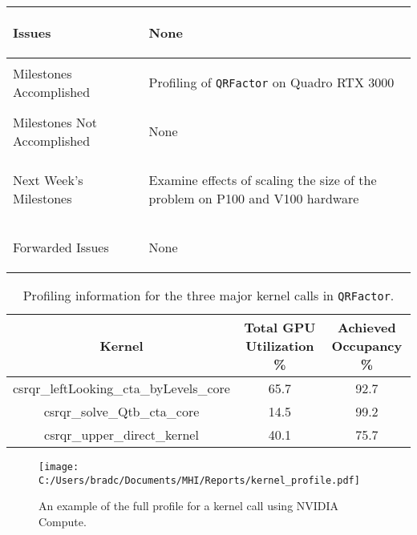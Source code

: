 \documentclass[11pt,letterpaper]{article}
\begin{document}
\begin{tabular}{| p{} | p{} |}
	Issues & \begin{enumerate*}
	\item[\tiny\textbullet] None
	\end{enumerate*} \\ \hline

	Milestones \newline Accomplished & \begin{enumerate*}
	\item[\tiny\textbullet] Profiling of \texttt{QRFactor} on Quadro RTX 3000 \newline
    \end{enumerate*} \\ \hline

	Milestones Not \newline Accomplished & \begin{enumerate*}
	\item[\tiny\textbullet] None
	\end{enumerate*} \\ \hline

	Next Week's \newline Milestones & \begin{enumerate*}
    \item[\tiny\textbullet] Examine effects of scaling the size of the problem on P100 and V100 hardware
	\end{enumerate*} \\ \hline

	Forwarded Issues & \begin{enumerate*}
	\item[\tiny\textbullet] None
	\end{enumerate*} \\ \hline
\end{tabular}

\vspace{.25in}

\begin{table}[ht]
    \centering
    \begin{tabular}{| c | c | c |}
        \hline
        {\bf Kernel} & {\bf Total GPU Utilization \%} & {\bf Achieved Occupancy \%}  \\ \hline
        csrqr\_leftLooking\_cta\_byLevels\_core & 65.7 & 92.7 \\ \hline
        csrqr\_solve\_Qtb\_cta\_core & 14.5 & 99.2 \\ \hline
        csrqr\_upper\_direct\_kernel & 40.1 & 75.7 \\ \hline
    \end{tabular}
    \caption{Profiling information for the three major kernel calls in \texttt{QRFactor}.}
    \label{t:gpu_profile}
\end{table}


\begin{figure}[!ht]
    \centering
    \texttt{[image: C:/Users/bradc/Documents/MHI/Reports/kernel\_profile.pdf]}
    \caption{An example of the full profile for a kernel call using NVIDIA Compute.}
    \label{f:kernel_profile}
\end{figure}
\end{document}
